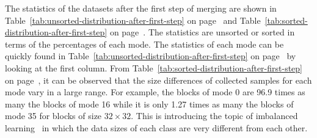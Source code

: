 The statistics of the datasets after the first step of merging are
shown in Table~\ref{tab:unsorted-distribution-after-first-step}
on page~\pageref{tab:unsorted-distribution-after-first-step} and 
Table~\ref{tab:sorted-distribution-after-first-step}
on page~\pageref{tab:sorted-distribution-after-first-step}.
The statistics are unsorted or sorted in terms of the percentages
of each mode.
The statistics of each mode can be quickly found 
in Table~\ref{tab:unsorted-distribution-after-first-step}
on page~\pageref{tab:unsorted-distribution-after-first-step}
by looking at the first column.
From Table~\ref{tab:sorted-distribution-after-first-step}
on page~\pageref{tab:sorted-distribution-after-first-step},
it can be observed that the size differences of collected samples 
for each mode vary in a large range.
For example, the blocks of mode 0 are 96.9 times as many
the blocks of mode 16
while it is only 1.27 times as many the blocks of mode 35
for blocks of size \(32\times32\).
This is introducing the topic of imbalanced 
learning~\parencite{RN215} in which
the data sizes of each class are very different 
from each other.

